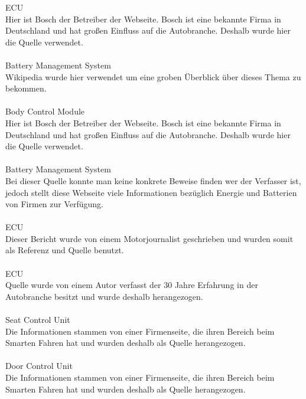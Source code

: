 ECU \cite{ECU.PB1}\\
Hier ist Bosch der Betreiber der Webseite. Bosch ist eine bekannte Firma in Deutschland und hat großen Einfluss auf die Autobranche. Deshalb wurde hier die Quelle verwendet.\\\\

Battery Management System \cite{BMS.PB1}\\
Wikipedia wurde hier verwendet um eine groben Überblick über dieses Thema zu bekommen.\\\\

Body Control Module \cite{BCM.PB1}\\
Hier ist Bosch der Betreiber der Webseite. Bosch ist eine bekannte Firma in Deutschland und hat großen Einfluss auf die Autobranche. Deshalb wurde hier die Quelle verwendet.\\\\

Battery Management System \cite{BMS.PB2}\\
Bei dieser Quelle konnte man keine konkrete Beweise finden wer der Verfasser ist, jedoch stellt diese Webseite viele Informationen bezüglich Energie und Batterien von Firmen zur Verfügung.\\\\

ECU \cite{ECU.PB2}\\
Dieser Bericht wurde von einem Motorjournalist geschrieben und wurden somit als Referenz und Quelle benutzt.\\\\

ECU \cite{ECU.PB3}\\
Quelle wurde von einem Autor verfasst der 30 Jahre Erfahrung in der Autobranche besitzt und wurde deshalb herangezogen.\\\\

Seat Control Unit \cite{seatcontrol.PB1}\\
Die Informationen stammen von einer Firmenseite, die ihren Bereich beim Smarten Fahren hat und wurden deshalb als Quelle herangezogen.\\\\

Door Control Unit \cite{doorcontrol.PB1}\\
Die Informationen stammen von einer Firmenseite, die ihren Bereich beim Smarten Fahren hat und wurden deshalb als Quelle herangezogen.\\\\

